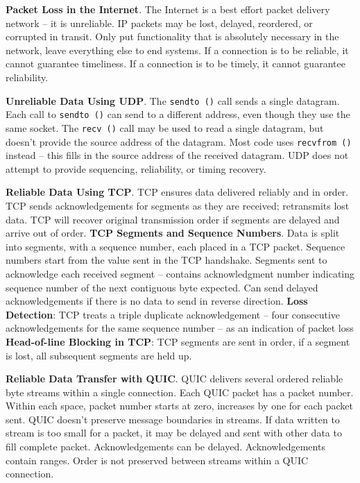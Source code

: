 \documentclass{article}
\begin{document}
\noindent \textbf{Packet Loss in the Internet}.
The Internet is a best effort packet delivery network – it is unreliable.
IP packets may be lost, delayed, reordered, or corrupted in transit.
Only put functionality that is absolutely necessary in the network, leave everything else to end systems.
If a connection is to be reliable, it cannot guarantee timeliness.
If a connection is to be timely, it cannot guarantee reliability.

\noindent \textbf{Unreliable Data Using UDP}.
The \texttt{sendto ()} call sends a single datagram.
Each call to \texttt{sendto ()} can send to a different address, even though they use the same socket.
The \texttt{recv ()} call may be used to read a single datagram, but doesn’t provide the source address of the datagram.
Most code uses \texttt{recvfrom ()} instead – this fills in the source address of the received datagram.
UDP does not attempt to provide sequencing, reliability, or timing recovery.

\noindent \textbf{Reliable Data Using TCP}.
TCP ensures data delivered reliably and in order.
TCP sends acknowledgements for segments as they are received; retransmits lost data.
TCP will recover original transmission order if segments are delayed and arrive out of order.
\textbf{TCP Segments and Sequence Numbers}. Data is split into segments, with a sequence number, each placed in a TCP packet.
Sequence numbers start from the value sent in the TCP handshake.
Segments sent to acknowledge each received segment – contains acknowledgment number indicating sequence number of the next
contiguous byte expected.
Can send delayed acknowledgements if there is no data to send in reverse direction.
\textbf{Loss Detection}: TCP treats a triple duplicate acknowledgement – four consecutive acknowledgements for the same sequence
number – as an indication of packet loss
\textbf{Head-of-line Blocking in TCP}: TCP segments are sent in order, if a segment is lost, all subsequent segments are held up.

\noindent \textbf{Reliable Data Transfer with QUIC}.
QUIC delivers several ordered reliable byte streams within a single connection.
Each QUIC packet has a packet number.
Within each space, packet number starts at zero, increases by one for each packet sent.
QUIC doesn’t preserve message boundaries in streams.
If data written to stream is too small for a packet, it may be
delayed and sent with other data to fill complete packet.
Acknowledgements can be delayed.
Acknowledgements contain ranges.
Order is not preserved between streams within a QUIC connection.
\end{document}
